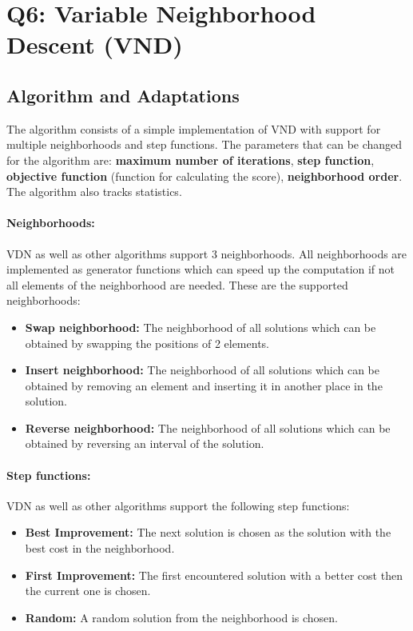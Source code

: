 \documentclass{article}
\begin{document}
\section*{Q6: Variable Neighborhood Descent (VND)}
\subsection*{Algorithm and Adaptations}
The algorithm consists of a simple implementation of VND with support for multiple neighborhoods and step functions. The parameters that can be changed for the algorithm are: \textbf{maximum number of iterations}, \textbf{step function}, \textbf{objective function} (function for calculating the score), \textbf{neighborhood order}. The algorithm also tracks statistics.

\paragraph{Neighborhoods:}
VDN as well as other algorithms support 3 neighborhoods. All neighborhoods are implemented as generator functions which can speed up the computation if not all elements of the neighborhood are needed. These are the supported neighborhoods:
\begin{itemize}
	\item \textbf{Swap neighborhood:} The neighborhood of all solutions which can be obtained by swapping the positions of 2 elements.
	\item \textbf{Insert neighborhood:} The neighborhood of all solutions which can be obtained by removing an element and inserting it in another place in the solution.
	\item \textbf{Reverse neighborhood:} The neighborhood of all solutions which can be obtained by reversing an interval of the solution.
\end{itemize}

\paragraph{Step functions:}
VDN as well as other algorithms support the following step functions:
\begin{itemize}
	\item \textbf{Best Improvement:} The next solution is chosen as the solution with the best cost in the neighborhood.
	\item \textbf{First Improvement:} The first encountered solution with a better cost then the current one is chosen.
	\item \textbf{Random:} A random solution from the neighborhood is chosen.
\end{itemize}
\end{document}
